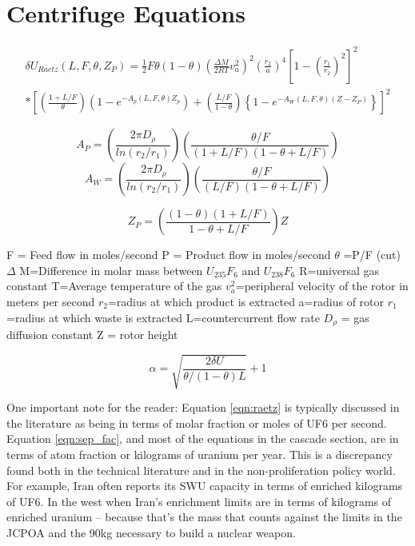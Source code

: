 \section{Centrifuge Equations}


\begin{multline}
  \label{eqn:raetz}
  \delta U_{Raetz}(L,F,\theta,Z_{P})
  =\frac{1}{2}F\theta (1-\theta)
  \left ( \frac{\Delta M}{2RT}v_{a}^{2} \right )^{2}
  \left ( \frac{r_{2}}{a} \right )^{4}
  \left [1-\left ( \frac{r_{1}}{r_2} \right )^{2}
  \right ] ^{2} \\
* \left[
  \left( \frac{1+L/F}{\theta} \right )
  \left ( 1 - e^{-A_{p}(L,F,\theta)Z_{p}}\right )
  + \left (\frac{L/F}{1-\theta}\right )
  \left \{ 1-e^{-A_{W}(L,F,\theta)(Z - Z_{P})} \right \} 
  \right]^{2}
\end{multline}


\begin{equation}
  A_{P} = \left (
  \frac{2 \pi D_{\rho}}{ln(r_{2}/r_{1})}
  \right )
  \left (
  \frac{\theta/F}{(1+L/F)(1-\theta+L/F)}
  \right )
\end{equation}
\begin{equation}
  A_{W} = \left (
  \frac{2 \pi D_{\rho}}{ln(r_{2}/r_{1})}
  \right )
  \left (
  \frac{\theta/F}{(L/F)(1-\theta+L/F)}
  \right )
\end{equation}

\begin{equation}
  Z_{P} = \left (
  \frac{(1-\theta)(1+L/F)}{1-\theta+L/F}
  \right ) Z
\end{equation}


F = Feed flow in moles/second
P = Product flow in moles/second
$\theta$ =P/F  (cut)
$\Delta$ M=Difference in molar mass between $U_{235}F_{6}$  and  $U_{238}F_{6}$
R=universal gas constant
T=Average temperature of the gas
$v_{a}^{2}$=peripheral velocity of the rotor in meters per second
$r_{2}$=radius at which product is extracted
a=radius of rotor
$r_{1}$=radius at which waste is extracted
L=countercurrent flow rate
$D_{\rho}$ = gas diffusion constant
Z = rotor height

\begin{equation}
  \label{eqn:sep_fac}
\alpha = \sqrt{\frac{2\delta U}{\theta/(1-\theta)L}} + 1
\end{equation}

One important note for the reader: Equation \ref{eqn:raetz} is typically discussed in the literature as being in terms of molar fraction or moles of \gls{UF6} per second. Equation \ref{eqn:sep_fac}, and most of the equations in the cascade section, are in terms of atom fraction or kilograms of uranium per year. This is a discrepancy found both in the technical literature and in the non-proliferation policy world. For example, Iran often reports its \gls{SWU} capacity in terms of enriched kilograms of \gls{UF6}. In the west when Iran’s enrichment limits are in terms of kilograms of enriched uranium – because that’s the mass that counts against the limits in the \gls{JCPOA} and the 90kg necessary to build a nuclear weapon.



